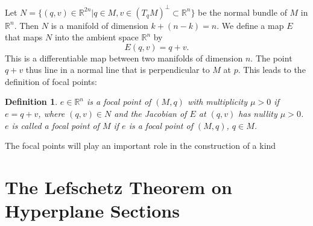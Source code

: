 \documentclass[12pt]{article}
\newtheorem{defn}[thm]{Definition}
\newcommand{\RR}{\mathbb{R}}      %
\begin{document}
Let $N = \{ (q,v) \in \RR^{2n} | q \in M, v \in (T_qM)^{\perp} \subset \RR^n \}$
be the normal bundle of $M$ in $\RR^n$. Then $N$ is a manifold of dimension
$k+(n-k)=n$. We define a map $E$ that maps $N$ into the ambient space $\RR^n$ by
\begin{equation}
  E(q, v) = q + v.
\end{equation}
This is a differentiable map between two manifolds of dimension $n$. The point
$q+v$ thus line in a normal line that is perpendicular to $M$ at $p$. This leads
to the definition of focal points:

\begin{defn}
  $e \in \RR^n$ is a focal point of $(M, q)$ with multiplicity $\mu > 0$ if $e =
  q+v$, where $(q, v) \in N$ and the Jacobian of $E$ at $(q, v)$ has nullity
  $\mu > 0$. $e$ is called a focal point of $M$ if $e$ is a focal point of $(M,
  q)$, $q \in M$.
\end{defn}

The focal points will play an important role in the construction of a kind





\section{The Lefschetz Theorem on Hyperplane Sections}
\end{document}
